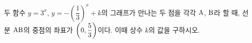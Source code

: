 두 함수 $y=3^x$, $y=-\left(\dfrac{1}{3}\right)^{x}+k$의 그래프가 만나는 두 점을 각각 $\mathrm{A}$, $\mathrm{B}$라 할 때, 선분 $\mathrm{AB}$의 중점의 좌표가 $\left(0{,}\mkern3mu\mathopen{}\dfrac{5}{3}\right)$이다. 이때 상수 $k$의 값을 구하시오.
